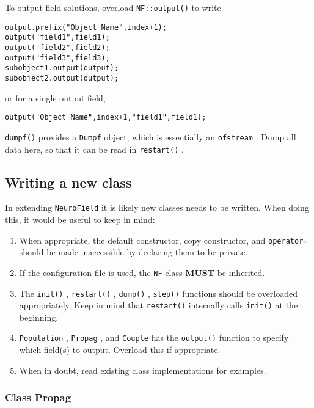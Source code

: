 \documentclass[12pt,a4paper]{article}
\newcommand{\type}[1]{ {\small\small\tt #1} }
\newcommand{\NF}[0]{ \type{NeuroField}}
\begin{document}
To output field solutions, overload \type{NF::output()} to write
\begin{lstlisting}
output.prefix("Object Name",index+1);
output("field1",field1);
output("field2",field2);
output("field3",field3);
subobject1.output(output);
subobject2.output(output);
\end{lstlisting}
or for a single output field,
\begin{lstlisting}
output("Object Name",index+1,"field1",field1);
\end{lstlisting}


\type{dumpf()} provides a \type{Dumpf} object, which is essentially an \type{ofstream}. Dump all data here, so that it can be read in \type{restart()}.

\subsection{Writing a new class}

In extending \NF it is likely new classes needs to be written. When doing this, it would be useful to keep in mind:
\begin{enumerate}
	\item When appropriate, the default constructor, copy constructor, and \type{operator=} should be made inaccessible by declaring them to be private.
	\item If the configuration file is used, the \type{NF} class \textbf{MUST} be inherited.
	\item The \type{init()}, \type{restart()}, \type{dump()}, \type{step()} functions should be overloaded appropriately. Keep in mind that \type{restart()} internally calls \type{init()} at the beginning.
	\item \type{Population}, \type{Propag}, and \type{Couple} has the \type{output()} function to specify which field(s) to output. Overload this if appropriate.
	\item When in doubt, read existing class implementations for examples.
\end{enumerate}

\subsubsection{Class Propag}
\label{sec:newpropag}
\end{document}
